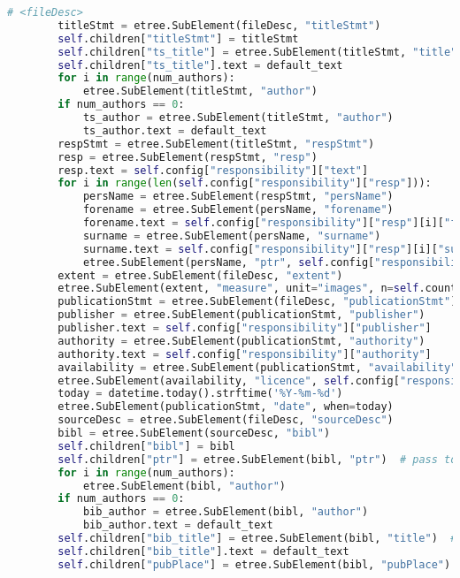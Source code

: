 \documentclass[class=article, crop=false]{standalone}
\begin{document}
\begin{lstlisting}[language=python, style=python]
        # <fileDesc>
        titleStmt = etree.SubElement(fileDesc, "titleStmt")
        self.children["titleStmt"] = titleStmt
        self.children["ts_title"] = etree.SubElement(titleStmt, "title")  # pass to other methods
        self.children["ts_title"].text = default_text
        for i in range(num_authors):
            etree.SubElement(titleStmt, "author")
        if num_authors == 0:
            ts_author = etree.SubElement(titleStmt, "author")
            ts_author.text = default_text
        respStmt = etree.SubElement(titleStmt, "respStmt")
        resp = etree.SubElement(respStmt, "resp")
        resp.text = self.config["responsibility"]["text"]
        for i in range(len(self.config["responsibility"]["resp"])):
            persName = etree.SubElement(respStmt, "persName")
            forename = etree.SubElement(persName, "forename")
            forename.text = self.config["responsibility"]["resp"][i]["forename"]
            surname = etree.SubElement(persName, "surname")
            surname.text = self.config["responsibility"]["resp"][i]["surname"]
            etree.SubElement(persName, "ptr", self.config["responsibility"]["resp"][i]["ptr"])
        extent = etree.SubElement(fileDesc, "extent")
        etree.SubElement(extent, "measure", unit="images", n=self.count)
        publicationStmt = etree.SubElement(fileDesc, "publicationStmt")
        publisher = etree.SubElement(publicationStmt, "publisher")
        publisher.text = self.config["responsibility"]["publisher"]
        authority = etree.SubElement(publicationStmt, "authority")
        authority.text = self.config["responsibility"]["authority"]
        availability = etree.SubElement(publicationStmt, "availability", self.config["responsibility"]["availability"])
        etree.SubElement(availability, "licence", self.config["responsibility"]["licence"])
        today = datetime.today().strftime('%Y-%m-%d')
        etree.SubElement(publicationStmt, "date", when=today)
        sourceDesc = etree.SubElement(fileDesc, "sourceDesc")
        bibl = etree.SubElement(sourceDesc, "bibl")
        self.children["bibl"] = bibl
        self.children["ptr"] = etree.SubElement(bibl, "ptr")  # pass to other methods
        for i in range(num_authors):
            etree.SubElement(bibl, "author")
        if num_authors == 0:
            bib_author = etree.SubElement(bibl, "author")
            bib_author.text = default_text
        self.children["bib_title"] = etree.SubElement(bibl, "title")  # pass to other methods
        self.children["bib_title"].text = default_text
        self.children["pubPlace"] = etree.SubElement(bibl, "pubPlace")  # pass to other methods

\end{lstlisting}
\end{document}
